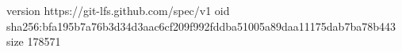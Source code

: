 version https://git-lfs.github.com/spec/v1
oid sha256:bfa195b7a76b3d34d3aac6cf209f992fddba51005a89daa11175dab7ba78b443
size 178571
